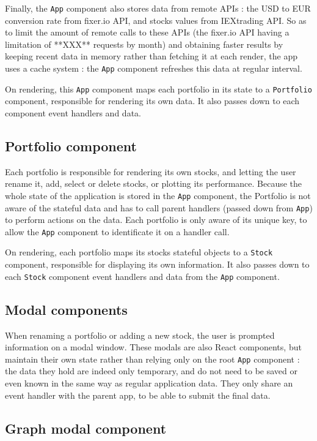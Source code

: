 \documentclass{article}
\begin{document}
    Finally, the \texttt{App} component also stores data from remote APIs : the USD to EUR conversion rate from fixer.io API, and stocks values from IEXtrading API. So as to limit the amount of remote calls to these APIs (the fixer.io API having a limitation of **XXX** requests by month) and obtaining faster results by keeping recent data in memory rather than fetching it at each render, the app uses a cache system : the \texttt{App} component refreshes this data at regular interval. 
    
    On rendering, this \texttt{App} component maps each portfolio in its state to a \texttt{Portfolio} component, responsible for rendering its own data. It also passes down to each component event handlers and data. 
    
    \subsection*{Portfolio component}
    
    Each portfolio is responsible for rendering its own stocks, and letting the user rename it, add, select or delete stocks, or plotting its performance. Because the whole state of the application is stored in the \texttt{App} component, the Portfolio is not aware of the stateful data and has to call parent handlers (passed down from \texttt{App}) to perform actions on the data. Each portfolio is only aware of its unique key, to allow the \texttt{App} component to identificate it on a handler call. 
    
    On rendering, each portfolio maps its stocks stateful objects to a \texttt{Stock} component, responsible for displaying its own information. It also passes down to each \texttt{Stock} component event handlers and data from the \texttt{App} component. 
    
    \subsection*{Modal components}
    
    When renaming a portfolio or adding a new stock, the user is prompted information on a modal window. These modals are also React components, but maintain their own state rather than relying only on the root \texttt{App} component : the data they hold are indeed only temporary, and do not need to be saved or even known in the same way as regular application data. They only share an event handler with the parent app, to be able to submit the final data. 
    
    \subsection*{Graph modal component}
\end{document}
